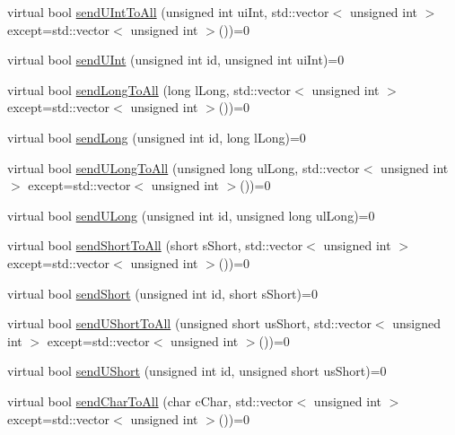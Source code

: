 \begin{DoxyCompactItemize}
\item 
virtual bool \hyperlink{class_rad_j_a_v_1_1_networking_1_1_tcpip_server_a6e60288010a4560fc00a4035e1c2a470}{send\+U\+Int\+To\+All} (unsigned int ui\+Int, std\+::vector$<$ unsigned int $>$ except=std\+::vector$<$ unsigned int $>$())=0
\item 
virtual bool \hyperlink{class_rad_j_a_v_1_1_networking_1_1_tcpip_server_a465d9c6e6611f015c566acc890f22e4e}{send\+U\+Int} (unsigned int id, unsigned int ui\+Int)=0
\item 
virtual bool \hyperlink{class_rad_j_a_v_1_1_networking_1_1_tcpip_server_a127b99aa98eb1d48001376a33190e81a}{send\+Long\+To\+All} (long l\+Long, std\+::vector$<$ unsigned int $>$ except=std\+::vector$<$ unsigned int $>$())=0
\item 
virtual bool \hyperlink{class_rad_j_a_v_1_1_networking_1_1_tcpip_server_a9daf0399b1b6cd1226221d0d8bde7993}{send\+Long} (unsigned int id, long l\+Long)=0
\item 
virtual bool \hyperlink{class_rad_j_a_v_1_1_networking_1_1_tcpip_server_ab87680c4aa41a1cd7bb7b9e56bc0e344}{send\+U\+Long\+To\+All} (unsigned long ul\+Long, std\+::vector$<$ unsigned int $>$ except=std\+::vector$<$ unsigned int $>$())=0
\item 
virtual bool \hyperlink{class_rad_j_a_v_1_1_networking_1_1_tcpip_server_aafae1fc2ff43ed3c66d721b88fc9d9b0}{send\+U\+Long} (unsigned int id, unsigned long ul\+Long)=0
\item 
virtual bool \hyperlink{class_rad_j_a_v_1_1_networking_1_1_tcpip_server_a10114a421a940cc5da3b54a10f732e30}{send\+Short\+To\+All} (short s\+Short, std\+::vector$<$ unsigned int $>$ except=std\+::vector$<$ unsigned int $>$())=0
\item 
virtual bool \hyperlink{class_rad_j_a_v_1_1_networking_1_1_tcpip_server_aaa24c728d0eb2066938c762d24927568}{send\+Short} (unsigned int id, short s\+Short)=0
\item 
virtual bool \hyperlink{class_rad_j_a_v_1_1_networking_1_1_tcpip_server_ae883e39f5bde3d790a47faa29f79b49d}{send\+U\+Short\+To\+All} (unsigned short us\+Short, std\+::vector$<$ unsigned int $>$ except=std\+::vector$<$ unsigned int $>$())=0
\item 
virtual bool \hyperlink{class_rad_j_a_v_1_1_networking_1_1_tcpip_server_a0e2f2edd1580ae9bc37667ed6f85554e}{send\+U\+Short} (unsigned int id, unsigned short us\+Short)=0
\item 
virtual bool \hyperlink{class_rad_j_a_v_1_1_networking_1_1_tcpip_server_a870b35e5674485806030587fa5e80cf7}{send\+Char\+To\+All} (char c\+Char, std\+::vector$<$ unsigned int $>$ except=std\+::vector$<$ unsigned int $>$())=0

\end{DoxyCompactItemize}
